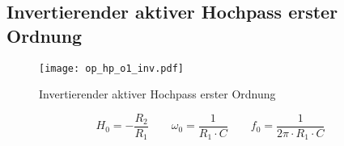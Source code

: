 



\subsection{Invertierender aktiver Hochpass erster Ordnung}
\begin{figure}[h!]
	\centering
	\texttt{[image: op\_hp\_o1\_inv.pdf]}
	\caption{Invertierender aktiver Hochpass erster Ordnung}
	\label{sch:op-hp-o1-inv}
\end{figure}
\[ H_0 = - \frac{R_2}{R_1} \qquad
\omega_0 = \frac{1}{R_1 \cdot C} \qquad
f_0 = \frac{1}{2 \pi \cdot R_1 \cdot C} \]